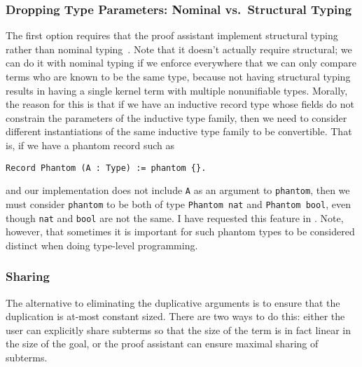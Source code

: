 \subsubsection{Dropping Type Parameters: Nominal vs.\ Structural Typing} \label{sec:nominal-vs-structural} \label{sec:dropping-constructor-parameters}
The first option requires that the proof assistant implement structural typing rather than nominal typing~\cite[19.3 Nominal and Structural Type Systems]{tapl}.
Note that it doesn't actually require structural; we can do it with nominal typing if we enforce everywhere that we can only compare terms who are known to be the same type, because not having structural typing results in having a single kernel term with multiple nonunifiable types.
%
%
%
Morally, the reason for this is that if we have an inductive record type whose fields do not constrain the parameters of the inductive type family, then we need to consider different instantiations of the same inductive type family to be convertible.
That is, if we have a phantom record such as
\begin{verbatim}
Record Phantom (A : Type) := phantom {}.
\end{verbatim}
and our implementation does not include \texttt{A} as an argument to \texttt{phantom}, then we must consider \texttt{phantom} to be both of type \texttt{Phantom nat} and \texttt{Phantom bool}, even though \texttt{nat} and \texttt{bool} are not the same.
I have requested this feature in .
Note, however, that sometimes it is important for such phantom types to be considered distinct when doing type-level programming.
%

\subsubsection{Sharing} \label{sec:sharing}
The alternative to eliminating the duplicative arguments is to ensure that the duplication is at-most constant sized.
There are two ways to do this: either the user can explicitly share subterms so that the size of the term is in fact linear in the size of the goal, or the proof assistant can ensure maximal sharing of subterms.
%

